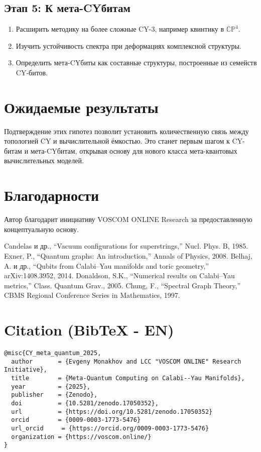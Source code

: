 \documentclass[12pt,a4paper]{article}
\begin{document}
\subsection{Этап 5: К мета-CYбитам}
\begin{enumerate}
\item Расширить методику на более сложные CY-3, 
например квинтику в $\mathbb{CP}^4$.  
\item Изучить устойчивость спектра при деформациях комплексной структуры.  
\item Определить мета-CYбиты как составные структуры, построенные из семейств CY-битов.  
\end{enumerate}

\section{Ожидаемые результаты}
Подтверждение этих гипотез позволит установить количественную связь 
между топологией CY и вычислительной ёмкостью. 
Это станет первым шагом к CY-битам и мета-CYбитам, 
открывая основу для нового класса мета-квантовых вычислительных моделей.  

\section*{Благодарности}
Автор благодарит инициативу VOSCOM ONLINE Research 
за предоставленную концептуальную основу.

\begin{thebibliography}{9}
Candelas и др., ``Vacuum configurations for superstrings,'' 
Nucl. Phys. B, 1985.
Exner, P., ``Quantum graphs: An introduction,'' 
Annals of Physics, 2008.
Belhaj, A. и др., ``Qubits from Calabi--Yau manifolds and toric geometry,'' 
arXiv:1408.3952, 2014.
Donaldson, S.K., ``Numerical results on Calabi--Yau metrics,'' 
Class. Quantum Grav., 2005.
Chung, F., ``Spectral Graph Theory,'' 
CBMS Regional Conference Series in Mathematics, 1997.
\end{thebibliography}

\section*{Citation (BibTeX - EN)}
\begin{verbatim}
@misc{CY_meta_quantum_2025,
  author       = {Evgeny Monakhov and LCC "VOSCOM ONLINE" Research Initiative},
  title        = {Meta-Quantum Computing on Calabi--Yau Manifolds},
  year         = {2025},
  publisher    = {Zenodo},
  doi          = {10.5281/zenodo.17050352},
  url          = {https://doi.org/10.5281/zenodo.17050352}
  orcid		   = {0009-0003-1773-5476}
  url_orcid     = {https://orcid.org/0009-0003-1773-5476}
  organization = {https://voscom.online/}
}
\end{verbatim}
\end{document}
